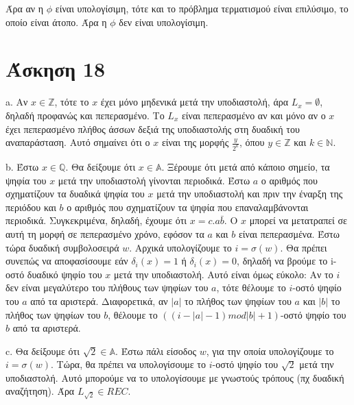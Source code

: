 \documentclass[a4paper, oneside, 11pt]{article}
\theoremstyle{definition}
\begin{document}
Άρα αν η $\phi$ είναι υπολογίσιμη, τότε και το πρόβλημα τερματισμού είναι επιλύσιμο, το οποίο είναι άτοπο.
Άρα η $\phi$ δεν είναι υπολογίσιμη.

\section*{Άσκηση 18}

a. Αν $x\in \mathbb{Z}$, τότε το $x$ έχει μόνο μηδενικά μετά την υποδιαστολή, άρα $L_x=\emptyset$,
δηλαδή προφανώς και πεπερασμένο. Το $L_x$ είναι πεπερασμένο αν και μόνο αν ο $x$ έχει πεπερασμένο
πλήθος άσσων δεξιά της υποδιαστολής στη δυαδική του αναπαράσταση. Αυτό σημαίνει ότι ο $x$ είναι της
μορφής $\frac{y}{2^k}$, όπου $y\in \mathbb{Z}$ και $k\in \mathbb{N}$.

b. Έστω $x\in \mathbb{Q}$. Θα δείξουμε ότι $x\in \mathbb{A}$. Ξέρουμε ότι μετά από κάποιο σημείο,
τα ψηφία του $x$ μετά την υποδιαστολή γίνονται περιοδικά. Έστω $a$ ο αριθμός που σχηματίζουν τα
δυαδικά ψηφία του $x$ μετά την υποδιαστολή και πριν την έναρξη της περιόδου και $b$ ο αριθμός που
σχηματίζουν τα ψηφία που επαναλαμβάνονται περιοδικά. Συγκεκριμένα, δηλαδή, έχουμε ότι
$x=c.a\bar{b}$. Ο $x$ μπορεί να μετατραπεί σε αυτή τη μορφή σε πεπερασμένο χρόνο, εφόσον τα $a$ και
$b$ είναι πεπερασμένα. Έστω τώρα δυαδική συμβολοσειρά $w$. Αρχικά υπολογίζουμε το $i=\sigma(w)$. 
Θα πρέπει συνεπώς να αποφασίσουμε εάν $\delta_i (x)=1$ ή $\delta_i (x)=0$, δηλαδή να βρούμε το 
i-οστό δυαδικό ψηφίο του $x$ μετά την υποδιαστολή. Αυτό είναι όμως εύκολο: Αν το $i$ δεν είναι μεγαλύτερο
του πλήθους των ψηφίων του $a$, τότε θέλουμε το $i$-οστό ψηφίο του $a$ από τα αριστερά. Διαφορετικά,
αν $|a|$ το πλήθος των ψηφίων του $a$ και $|b|$ το πλήθος των ψηφίων του $b$, θέλουμε το 
$((i-|a|-1) mod |b| + 1)$-οστό ψηφίο του $b$ από τα αριστερά. 

c. Θα δείξουμε ότι $\sqrt{2}\in \mathbb{A}$. Έστω πάλι είσοδος $w$, για την οποία υπολογίζουμε το 
$i=\sigma(w)$. Τώρα, θα πρέπει να υπολογίσουμε το $i$-οστό ψηφίο του $\sqrt{2}$ μετά την υποδιαστολή.
Αυτό μπορούμε να το υπολογίσουμε με γνωστούς τρόπους (πχ δυαδική αναζήτηση). Άρα $L_{\sqrt{2}}\in REC$.
\end{document}
